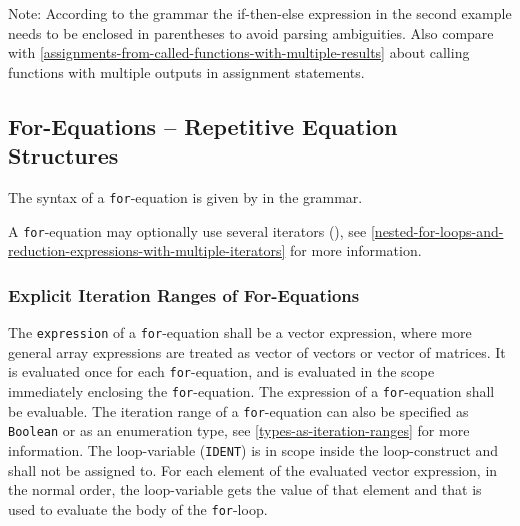 \begin{nonnormative}
Note: According to the grammar the if-then-else expression in the second example needs to be enclosed in parentheses to avoid parsing ambiguities.
Also compare with \cref{assignments-from-called-functions-with-multiple-results} about calling functions with multiple outputs in assignment statements.
\end{nonnormative}


\subsection{For-Equations -- Repetitive Equation Structures}\label{for-equations-repetitive-equation-structures}

The syntax of a \lstinline!for!-equation is given by  in the grammar.

A \lstinline!for!-equation may optionally use several iterators (), see \cref{nested-for-loops-and-reduction-expressions-with-multiple-iterators} for more information.


\subsubsection{Explicit Iteration Ranges of For-Equations}\label{explicit-iteration-ranges-of-for-equations}

The \lstinline!expression! of a \lstinline!for!-equation shall be a vector expression, where more general array expressions are treated as vector of vectors or vector of matrices.
It is evaluated once for each \lstinline!for!-equation, and is evaluated in the scope immediately enclosing the \lstinline!for!-equation.
The expression of a \lstinline!for!-equation shall be evaluable.
The iteration range of a \lstinline!for!-equation can also be specified as \lstinline!Boolean! or as an enumeration type, see \cref{types-as-iteration-ranges} for more information.
The loop-variable (\lstinline!IDENT!) is in scope inside the loop-construct and shall not be assigned to.
For each element of the evaluated vector expression, in the normal order, the loop-variable gets the value of that element and that is used to evaluate the body of the \lstinline!for!-loop.

